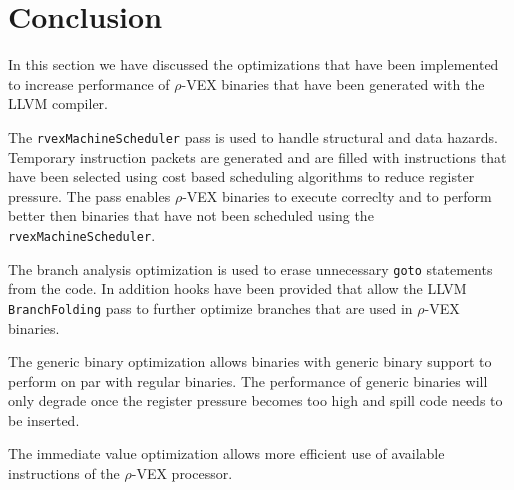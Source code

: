 \section{Conclusion}
In this section we have discussed the optimizations that have been implemented to increase performance of $\rho$-VEX binaries that have been generated with the LLVM compiler.

The \texttt{rvexMachineScheduler} pass is used to handle structural and data hazards. Temporary instruction packets are generated and are filled with instructions that have been selected using cost based scheduling algorithms to reduce register pressure. The pass enables $\rho$-VEX binaries to execute correclty and to perform better then binaries that have not been scheduled using the \texttt{rvexMachineScheduler}.

The branch analysis optimization is used to erase unnecessary \texttt{goto} statements from the code. In addition hooks have been provided that allow the LLVM \texttt{BranchFolding} pass to further optimize branches that are used in $\rho$-VEX binaries.

The generic binary optimization allows binaries with generic binary support to perform on par with regular binaries. The performance of generic binaries will only degrade once the register pressure becomes too high and spill code needs to be inserted.

The immediate value optimization allows more efficient use of available instructions of the  $\rho$-VEX processor.
\acresetall

